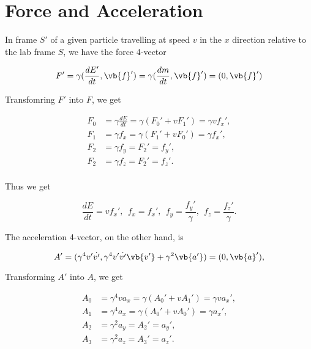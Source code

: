 \documentclass[english,a4paper,12pt]{report}
\begin{document}
\section{Force and Acceleration}

In frame \(S'\) of a given particle travelling at speed \(v\) in the \(x\) direction relative to the lab frame \(S\), we have the force 4-vector

\begin{equation}
    F' = \gamma (\frac{dE'}{dt}, \vb{f} ' ) = \gamma ( \frac{dm}{dt}, \vb{f} ' ) = (0, \vb{f} ')
\end{equation}

Transfomring \(F'\) into \(F\), we get

\begin{equation}
    \begin{aligned}
        F_0 &= \gamma \frac{dE}{dt} = \gamma (F_0 ' + v F_1 ') = \gamma v f_{x}' , \\
        F_1 &= \gamma f_{x} =  \gamma (F_1 ' + v F_0 ') = \gamma f_{x}', \\
        F_2 &= \gamma f_{y} = F_2 ' =  f_{y}' , \\
        F_2 &= \gamma f_{z} = F_2 ' =  f_{z}' . \\
    \end{aligned}
\end{equation}

Thus we get 

\begin{equation}
        \frac{dE}{dt} = vf_{x}',  ~~
        f_{x} = f_{x}', ~~
        f_{y} = \frac{f_{y}' }{\gamma }, ~~
        f_{z} = \frac{f_{z}' }{\gamma }.   
\end{equation}

The acceleration 4-vector, on the other hand, is 

\begin{equation}
    A' = (\gamma ^{4}v' \dot{v'} , \gamma ^{4} v' \dot{v'} \vb{v'} + \gamma ^2 \vb{a'}) = (0,\vb{a} '),
\end{equation}

Transforming \(A'\) into \(A\), we get 

\begin{equation}
    \begin{aligned}
        A_0 &= \gamma ^{4}va_{x} = \gamma (A_0 ' + vA_1 ') = \gamma v a_{x}', \\
        A_1 &= \gamma ^{4} a_{x} = \gamma (A_0 ' + vA_0 ' ) = \gamma a_{x}', \\
        A_2 &= \gamma ^2 a_{y} = A_2 ' = a_{y}', \\
        A_3 &= \gamma ^2 a_{z} = A_3 ' = a_{z}'.           
    \end{aligned}
\end{equation}
\end{document}
